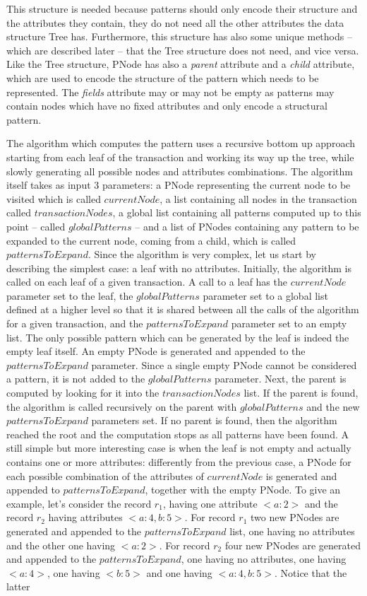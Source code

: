 \documentclass{acm_proc_article-sp-sigmod09}
\begin{document}
This structure is needed because patterns should only encode their structure and the attributes they contain, they do not need all the other attributes the data structure Tree has. Furthermore, this structure has also some unique methods -- which are described later -- that the Tree structure does not need, and vice versa. Like the Tree structure, PNode has also a \emph{parent} attribute and a \emph{child} attribute, which are used to encode the structure of the pattern which needs to be represented. The \emph{fields} attribute may or may not be empty as patterns may contain nodes which have no fixed attributes and only encode a structural pattern.

The algorithm which computes the pattern uses a recursive bottom up approach starting from each leaf of the transaction and working its way up the tree, while slowly generating all possible nodes and attributes combinations. The algorithm itself takes as input 3 parameters: a PNode representing the current node to be visited which is called $currentNode$, a list containing all nodes in the transaction called $transactionNodes$, a global list containing all patterns computed up to this point -- called $globalPatterns$ -- and a list of PNodes containing any pattern to be expanded to the current node, coming from a child, which is called $patternsToExpand$. Since the algorithm is very complex, let us start by describing the simplest case: a leaf with no attributes. Initially, the algorithm is called on each leaf of a given transaction. A call to a leaf has the $currentNode$ parameter set to the leaf, the $globalPatterns$ parameter set to a global list defined at a higher level so that it is shared between all the calls of the algorithm for a given transaction, and the $patternsToExpand$ parameter set to an empty list. The only possible pattern which can be generated by the leaf is indeed the empty leaf itself. An empty PNode is generated and appended to the $patternsToExpand$ parameter. Since a single empty PNode cannot be considered a pattern, it is not added to the $globalPatterns$ parameter. Next, the parent is computed by looking for it into the $transactionNodes$ list. If the parent is found, the algorithm is called recursively on the parent with $globalPatterns$ and the new $patternsToExpand$ parameters set. If no parent is found, then the algorithm reached the root and the computation stops as all patterns have been found. A still simple but more interesting case is when the leaf is not empty and actually contains one or more attributes: differently from the previous case, a PNode for each possible combination of the attributes of $currentNode$ is generated and appended to $patternsToExpand$, together with the empty PNode.  To give an example, let's consider the record $r_1$, having one attribute $<a \colon 2>$ and the record $r_2$ having attributes $<a \colon 4, b \colon 5>$. For record $r_1$ two new PNodes are generated and appended to the $patternsToExpand$ list, one having no attributes and the other one having $<a \colon 2>$. For record $r_2$ four new PNodes are generated and appended to the $patternsToExpand$, one having no attributes, one having $<a \colon 4>$, one having $<b \colon 5>$ and one having $<a \colon 4, b \colon 5>$. Notice that the latter 
\end{document}
